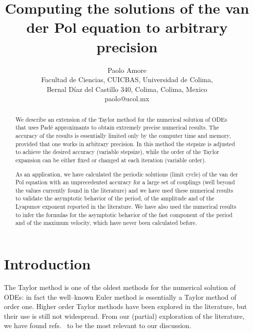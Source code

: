 \documentclass[final]{article}
\begin{document}
\lstset{language=Mathematica}


\title{Computing the solutions of the van der Pol equation to arbitrary precision}

\author{
Paolo Amore \\
Facultad de Ciencias, CUICBAS, Universidad de Colima,\\
Bernal D\'{i}az del Castillo 340, Colima, Colima, Mexico  \\
paolo@ucol.mx}
\maketitle

\begin{abstract}
We describe an extension of the Taylor method for the numerical solution of ODEs that uses Pad\'e approximants to obtain extremely precise numerical results.
The accuracy of the results is essentially limited only by the computer time and memory, provided that one works in arbitrary precision. In this method the stepsize 
is adjusted to achieve the desired accuracy (variable stepsize), while the order of the Taylor expansion can be either fixed or changed at each iteration (variable order).

As an application, we have calculated the periodic solutions (limit cycle) of the van der Pol equation with an unprecedented accuracy for a large set of couplings (well beyond the values currently found in the literature) and we have used these numerical results to validate the asymptotic behavior of the period, of the amplitude and of the Lyapunov exponent reported in the literature.
We have also used the numerical results to infer the formulas for the asymptotic behavior of the fast component of the period and of the maximum velocity, which have never been calculated before.
\end{abstract}


\section{Introduction}
\label{Intro}

The Taylor method is one of the oldest methods for the numerical solution of ODEs: in fact 
the well--known Euler method is essentially  a Taylor method of order one. 
Higher order Taylor methods have been explored in the literature, but their use is still not widespread. 
From our (partial) exploration of the literature, we have found refs.~\cite{Deprit66, Corliss82, Chang94, Jorba05, Barrio05, Barrio05b, Barrio11, Barrio12}
to be the most relevant to our discussion.
\end{document}
